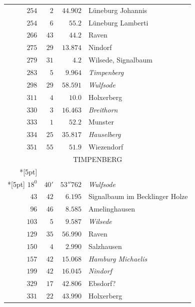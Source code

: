 \begin{longtable}{@{}rrrp{.61\linewidth}@{}}
\(254\)&\(2\)&\(44.902\)&\raggedright Lüneburg Johannis\tabularnewline
\(254\)&\(6\)&\(55.2\)&\raggedright Lüneburg Lamberti\tabularnewline
\(266\)&\(43\)&\(44.2\)&\raggedright Raven\tabularnewline
\(275\)&\(29\)&\(13.874\)&\raggedright Nindorf\tabularnewline
\(279\)&\(31\)&\(4.2\)&\raggedright Wilsede, Signalbaum\tabularnewline
\(283\)&\(5\)&\(9.964\)&\raggedright \textit{Timpenberg}\tabularnewline
\(298\)&\(29\)&\(58.591\)&\raggedright \textit{Wulfsode}\tabularnewline
\(311\)&\(4\)&\(10.0\)&\raggedright Holxerberg\tabularnewline
\(330\)&\(3\)&\(16.463\)&\raggedright \textit{Breithorn}\tabularnewline
\(333\)&\(1\)&\(52.2\)&\raggedright Munster\tabularnewline
\(334\)&\(25\)&\(35.817\)&\raggedright \textit{Hauselberg}\tabularnewline
\(351\)&\(55\)&\(51.9\)&\raggedright Wiezendorf\tabularnewline
\multicolumn{4}{c}{\strut TIMPENBERG}\\*[5pt]
\multicolumn{4}{c}{\(-177253.420\)\qquad\(-21852.221\)}\\*[5pt]
\(18^{0}\)&\(40'\)&\(53''762\)&\raggedright \textit{Wulfsode}\tabularnewline
\(43\)&\(42\)&\(6.195\)&\raggedright Signalbaum im Becklinger Holze\tabularnewline
\(96\)&\(46\)&\(8.585\)&\raggedright Amelinghausen\tabularnewline
\(103\)&\(5\)&\(9.587\)&\raggedright \textit{Wilsede}\tabularnewline
\(129\)&\(35\)&\(56.990\)&\raggedright Raven\tabularnewline
\(150\)&\(4\)&\(2.990\)&\raggedright Salzhausen\tabularnewline
\(157\)&\(42\)&\(15.068\)&\raggedright \textit{Hamburg Michaelis}\tabularnewline
\(199\)&\(42\)&\(16.045\)&\raggedright \textit{Nindorf}\tabularnewline
\(329\)&\(17\)&\(42.806\)&\raggedright Ebsdorf?\tabularnewline
\(331\)&\(22\)&\(43.990\)&\raggedright Holxerberg\tabularnewline
\end{longtable}
\endgroup
